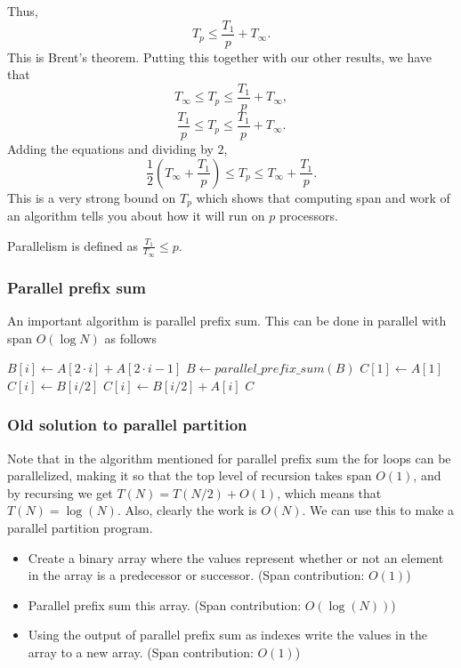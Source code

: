 \documentclass{beamer}
\begin{document}
\begin{frame}
Thus, 
$$T_p \leq \frac{T_1}{p} + T_\infty.$$
This is Brent's theorem. Putting this together with our other results, we have that 
$$T_\infty \leq T_p \leq \frac{T_1}{p} + T_\infty,$$
$$\frac{T_1}{p} \leq T_p \leq \frac{T_1}{p} + T_\infty.$$
Adding the equations and dividing by $2$,
$$\frac{1}{2}(T_\infty+\frac{T_1}{p})\leq T_p \leq T_\infty+\frac{T_1}{p}.$$
This is a very strong bound on $T_p$ which shows that computing span and work of an algorithm tells you about how it will run on $p$ processors. 

Parallelism is defined as $\frac{T_1}{T_\infty} \leq p$.
\end{frame}


\begin{frame}
\frametitle{Parallel prefix sum}
An important algorithm is parallel prefix sum. This can be done in parallel with span $O(\log N)$ as follows
\begin{algorithmic}
		\State $B[i]\gets A[2\cdot i]+A[2\cdot i-1]$
	\EndFor
	\State $B \gets parallel\_prefix\_sum(B)$
	\State $C[1] \gets A[1]$
			\State $C[i]\gets B[i/2]$
		\Else
			\State $C[i]\gets B[i/2]+A[i]$			
		\EndIf
	\EndFor	
	\State \Return $C$
\EndFunction
\end{algorithmic}
\end{frame}

\begin{frame}
\frametitle{Old solution to parallel partition}
Note that in the algorithm mentioned for parallel prefix sum the for loops can be parallelized, making it so that the top level of recursion takes span $O(1)$, and by recursing we get $T(N) = T(N/2)+O(1)$, which means that $T(N)=\log(N)$. Also, clearly the work is $O(N)$. We can use this to make a parallel partition program. 
\begin{itemize}
	\item Create a binary array where the values represent whether or not an element in the array is a predecessor or successor. (Span contribution: $O(1)$)
	\item Parallel prefix sum this array. (Span contribution: $O(\log(N))$)
	\item Using the output of parallel prefix sum as indexes write the values in the array to a new array. (Span contribution: $O(1)$)
\end{itemize}
\end{frame}
\end{document}
